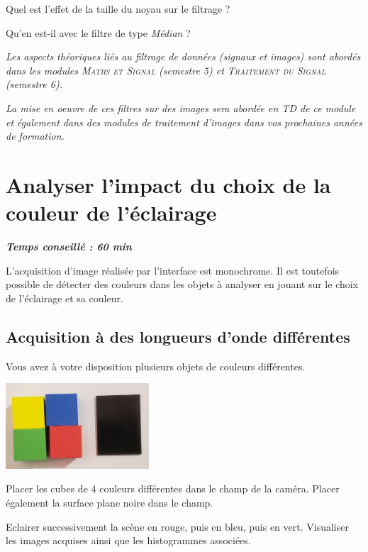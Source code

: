\documentclass[a4paper,11pt,titlepage]{article} %
\begin{document}
\Quest Quel est l'effet de la taille du noyau sur le filtrage ?

\Quest Qu'en est-il avec le filtre de type \textsl{Médian} ? 

\medskip

\textit{Les aspects théoriques liés au filtrage de données (signaux et images) sont abordés dans les modules \textsc{Maths et Signal} (semestre 5) et \textsc{Traitement du Signal} (semestre 6).}

\textit{La mise en oeuvre de ces filtres sur des images sera abordée en TD de ce module et également dans des modules de traitement d'images dans vos prochaines années de formation.}


\newpage
\section{Analyser l'impact du choix de la couleur de l'éclairage}

\begin{center} \textbf{\textit{Temps conseillé : 60 min}} \end{center}

L'acquisition d'image réalisée par l'interface est monochrome. Il est toutefois possible de détecter des couleurs dans les objets à analyser en jouant sur le choix de l'éclairage et sa couleur.


\subsection{Acquisition à des longueurs d'onde différentes}

Vous avez à votre disposition plusieurs objets de couleurs différentes.

\begin{center}
	\includegraphics[width=0.4\textwidth]{images/cubes.jpg}
\end{center}


\Manip Placer les cubes de 4 couleurs différentes dans le champ de la caméra. Placer également la surface plane noire dans le champ.

\Manip Eclairer successivement la scène en rouge, puis en bleu, puis en vert. Visualiser les images acquises ainsi que les histogrammes associées.
\end{document}
